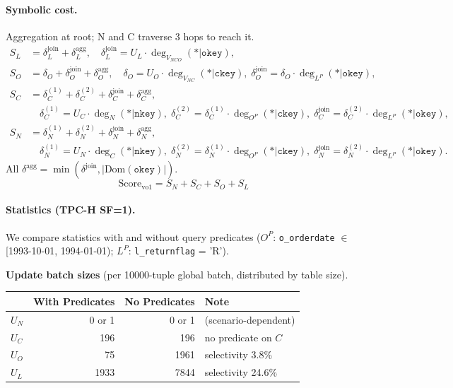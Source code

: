 \paragraph{Symbolic cost.}
Aggregation at root; N and C traverse 3 hops to reach it.
\begin{align*}
S_L &= \delta^{\mathrm{join}}_L + \delta^{\mathrm{agg}}_L,
\quad \delta^{\mathrm{join}}_L = U_L \cdot \deg_{V_{NCO}}(*|\texttt{okey}),\\[4pt]
S_O &= \delta_O + \delta^{\mathrm{join}}_O + \delta^{\mathrm{agg}}_O,
\quad \delta_O = U_O \cdot \deg_{V_{NC}}(*|\texttt{ckey}),\;
\delta^{\mathrm{join}}_O = \delta_O \cdot \deg_{L^P}(*|\texttt{okey}),\\[4pt]
S_C &= \delta^{(1)}_C + \delta^{(2)}_C + \delta^{\mathrm{join}}_C + \delta^{\mathrm{agg}}_C,\\
&\quad \delta^{(1)}_C = U_C \cdot \deg_N(*|\texttt{nkey}),\;
\delta^{(2)}_C = \delta^{(1)}_C \cdot \deg_{O^P}(*|\texttt{ckey}),\;
\delta^{\mathrm{join}}_C = \delta^{(2)}_C \cdot \deg_{L^P}(*|\texttt{okey}),\\[4pt]
S_N &= \delta^{(1)}_N + \delta^{(2)}_N + \delta^{\mathrm{join}}_N + \delta^{\mathrm{agg}}_N,\\
&\quad \delta^{(1)}_N = U_N \cdot \deg_C(*|\texttt{nkey}),\;
\delta^{(2)}_N = \delta^{(1)}_N \cdot \deg_{O^P}(*|\texttt{ckey}),\;
\delta^{\mathrm{join}}_N = \delta^{(2)}_N \cdot \deg_{L^P}(*|\texttt{okey}).
\end{align*}
All $\delta^{\mathrm{agg}} = \min(\delta^{\mathrm{join}}, |\mathrm{Dom}(\texttt{okey})|)$.
\[
\boxed{\mathrm{Score}_{\mathrm{vo1}} = S_N + S_C + S_O + S_L}
\]

\paragraph{Statistics (TPC-H SF=1).}
We compare statistics with and without query predicates
($O^P$: \texttt{o\_orderdate} $\in$ [1993-10-01, 1994-01-01);
$L^P$: \texttt{l\_returnflag} = 'R').

\smallskip
\noindent\textbf{Update batch sizes} (per 10000-tuple global batch, distributed by table size).
\begin{center}
\begin{tabular}{lrrl}
\toprule
& With Predicates & No Predicates & Note \\
\midrule
$U_N$ & 0 or 1 & 0 or 1 & (scenario-dependent) \\
$U_C$ & 196 & 196 & no predicate on $C$ \\
$U_O$ & 75 & 1961 & selectivity 3.8\% \\
$U_L$ & 1933 & 7844 & selectivity 24.6\% \\
\bottomrule
\end{tabular}
\end{center}

